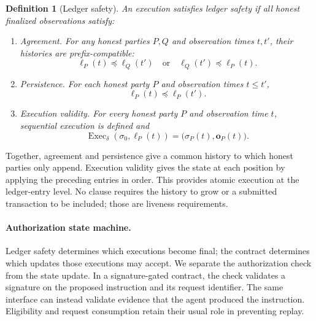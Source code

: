 \documentclass[10pt,letterpaper]{article}
\newtheorem{definition}{Definition}
\begin{document}
\begin{definition}[Ledger safety]
\label{def:ledger-safety}
An execution satisfies ledger safety if all honest finalized observations satisfy:
\begin{enumerate}[label=(\alph*)]
 \item \emph{Agreement.} For any honest parties $P,Q$ and observation times $t,t'$, their histories are prefix-compatible:
 \[
   \ell_P(t)\preceq\ell_Q(t')\quad\text{or}\quad
   \ell_Q(t')\preceq\ell_P(t).
 \]
 \item \emph{Persistence.} For each honest party $P$ and observation times $t\leq t'$,
 \[
   \ell_P(t)\preceq\ell_P(t').
 \]
 \item \emph{Execution validity.} For every honest party $P$ and observation time $t$, sequential execution is defined and
 \[
   \operatorname{Exec}_\delta(\sigma_0,\ell_P(t))
      =\bigl(\sigma_P(t),\mathbf o_P(t)\bigr).
 \]
\end{enumerate}
\end{definition}
Together, agreement and persistence give a common history to which honest parties only append. Execution validity gives the state at each position by applying the preceding entries in order. This provides atomic execution at the ledger-entry level. No clause requires the history to grow or a submitted transaction to be included; those are liveness requirements.

\paragraph{Authorization state machine.}
Ledger safety determines which executions become final; the contract determines which updates those executions may accept. We separate the authorization check from the state update. In a signature-gated contract, the check validates a signature on the proposed instruction and its request identifier. The same interface can instead validate evidence that the agent produced the instruction. Eligibility and request consumption retain their usual role in preventing replay.
\end{document}

